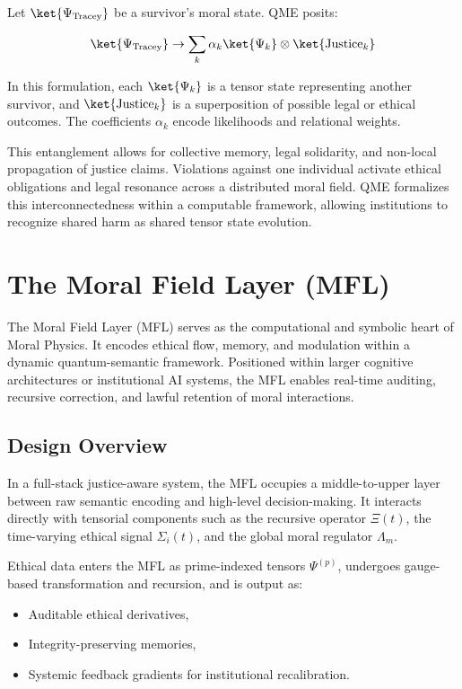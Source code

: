 \documentclass[12]{amsart}
\theoremstyle{plain}
\begin{document}
Let \(\ket{\Psi_{\text{Tracey}}}\) be a survivor's moral state. QME posits:

\[
\ket{\Psi_{\text{Tracey}}} \rightarrow \sum_k \alpha_k \ket{\Psi_k} \otimes \ket{\text{Justice}_k}
\]

In this formulation, each \(\ket{\Psi_k}\) is a tensor state representing another survivor, and \(\ket{\text{Justice}_k}\) is a superposition of possible legal or ethical outcomes. The coefficients \(\alpha_k\) encode likelihoods and relational weights.

This entanglement allows for collective memory, legal solidarity, and non-local propagation of justice claims. Violations against one individual activate ethical obligations and legal resonance across a distributed moral field. QME formalizes this interconnectedness within a computable framework, allowing institutions to recognize shared harm as shared tensor state evolution.

\section{The Moral Field Layer (MFL)}

The Moral Field Layer (MFL) serves as the computational and symbolic heart of Moral Physics. It encodes ethical flow, memory, and modulation within a dynamic quantum-semantic framework. Positioned within larger cognitive architectures or institutional AI systems, the MFL enables real-time auditing, recursive correction, and lawful retention of moral interactions.

\subsection{Design Overview}

In a full-stack justice-aware system, the MFL occupies a middle-to-upper layer between raw semantic encoding and high-level decision-making. It interacts directly with tensorial components such as the recursive operator \(\Xi(t)\), the time-varying ethical signal \(\Sigma_i(t)\), and the global moral regulator \(\Lambda_m\).

Ethical data enters the MFL as prime-indexed tensors \(\Psi^{(p)}\), undergoes gauge-based transformation and recursion, and is output as:
\begin{itemize}
    \item Auditable ethical derivatives,
    \item Integrity-preserving memories,
    \item Systemic feedback gradients for institutional recalibration.
\end{itemize}
\end{document}
